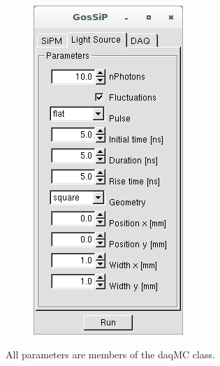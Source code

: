 \begin{figure}[h!]
	\includegraphics[height=0.25\textheight]{GUI2.png}
\end{figure}

All parameters are members of the daqMC class.

